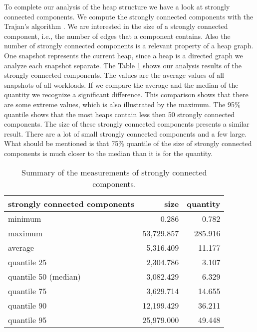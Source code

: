 To complete our analysis of the heap structure we have a look at strongly connected components. We compute the strongly connected components with the Trajan's algorithm \cite{Trajan}. We are interested in the size of a strongly connected component, i.e., the number of edges that a component contains. Also the number of strongly connected components is a relevant property of a heap graph. One snapshot represents the current heap, since a heap is a directed graph we analyze each snapshot separate. The Table \ref{tab:scc_stats} shows our analysis results of the strongly connected components. The values are the average values of all snapshots of all workloads. If we compare the average and the median of the quantity we recognize a significant difference. This comparison shows that there are some extreme values, which is also illustrated by the maximum. The 95\% quantile shows that the most heaps contain less then 50 strongly connected components. The size of these strongly connected components presents a similar result. There are a lot of small strongly connected components and a few large. What should be mentioned is that 75\% quantile of the size of strongly connected components is much closer to the median than it is for the quantity.
\begin{table}
	\small
	\centering
	\begin{tabular}{l r r}
		\toprule
		\textbf{strongly connected components} & \textbf{size} & \textbf{quantity} \\ \midrule
		minimum							&	0.286		&	0.782			\\ 
		maximum							&	53,729.857	&	285.916			\\ 
		average							&	5,316.409	&	11.177			\\ 
		quantile 25						&	2,304.786	&	3.107			\\ 
		quantile 50	(median)			&	3,082.429	&	6.329			\\ 
		quantile 75						&	3,629.714	&	14.655			\\ 
		quantile 90						&	12,199.429	&	36.211			\\ 
		quantile 95						&	25,979.000	&	49.448			\\ \bottomrule
	\end{tabular}
	\caption{Summary of the measurements of strongly connected components.}
	\label{tab:scc_stats}
\end{table}